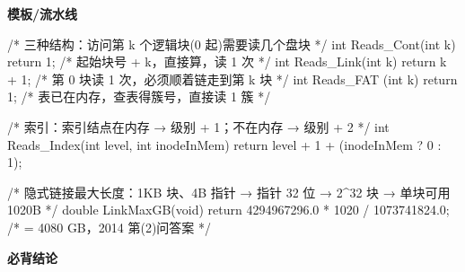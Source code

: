 \documentclass[10pt,a4paper]{ctexart}
\begin{document}

\textbf{模板/流水线}

\begin{codebox}
/* 三种结构：访问第 k 个逻辑块(0 起)需要读几个盘块 */
int Reads_Cont(int k) { return 1; }          /* 起始块号 + k，直接算，读 1 次 */
int Reads_Link(int k) { return k + 1; }      /* 第 0 块读 1 次，必须顺着链走到第 k 块 */
int Reads_FAT (int k) { return 1; }          /* 表已在内存，查表得簇号，直接读 1 簇 */

/* 索引：索引结点在内存 → 级别 + 1；不在内存 → 级别 + 2 */
int Reads_Index(int level, int inodeInMem) {
    return level + 1 + (inodeInMem ? 0 : 1);
}

/* 隐式链接最大长度：1KB 块、4B 指针 → 指针 32 位 → 2^32 块 → 单块可用 1020B */
double LinkMaxGB(void) {
    return 4294967296.0 * 1020 / 1073741824.0;   /* = 4080 GB，2014 第(2)问答案 */
}
\end{codebox}




\textbf{必背结论}
\end{document}
